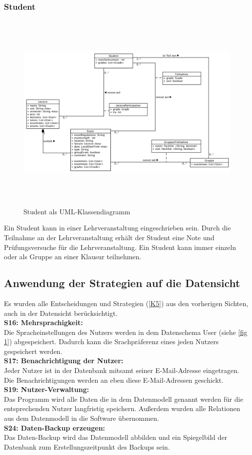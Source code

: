 \subsubsection{Student}
\begin{figure}[H]
	\centering
  \includegraphics[width=\textwidth,height=10cm,keepaspectratio]{../UMLDiagramme/datenmodell/student.png}
	\caption{Student als UML-Klassendiagramm}
	\label{fig 3}
\end{figure}
Ein Student kann in einer Lehrveranstaltung eingeschrieben sein. Durch die Teilnahme an der Lehrveranstaltung erhält der Student eine Note und Prüfungsversuche für die Lehrveranstaltung. Ein Student kann immer einzeln oder als Gruppe an einer Klausur teilnehmen.

\subsection{Anwendung der Strategien auf die Datensicht}
Es wurden alle Entscheidungen und Strategien (\ref{K5}) aus den vorherigen Sichten, auch in der Datensicht berücksichtigt.
\\
\textbf{S16: Mehrsprachigkeit:}\\
Die Spracheinstellungen des Nutzers werden in dem Datenschema User (siehe \ref{fig 1}) abgespeichert. Dadurch kann die Srachpräferenz eines jeden Nutzers gespeichert werden.\\
\textbf{S17: Benachrichtigung der Nutzer:}\\
Jeder Nutzer ist in der Datenbank mitsamt seiner E-Mail-Adresse eingetragen. Die Benachrichtigungen werden an eben diese E-Mail-Adressen geschickt.\\
\textbf{S19: Nutzer-Verwaltung:}\\
Das Programm wird alle Daten die in dem Datenmodell genannt werden für die entsprechenden Nutzer langfristig speichern.
Außerdem wurden alle Relationen aus dem Datenmodell in die Software übernommen.\\
\textbf{S24: Daten-Backup erzeugen:}\\
Das Daten-Backup wird das Datenmodell abbilden und ein Spiegelbild der Datenbank zum Erstellungszeitpunkt des Backups sein.  